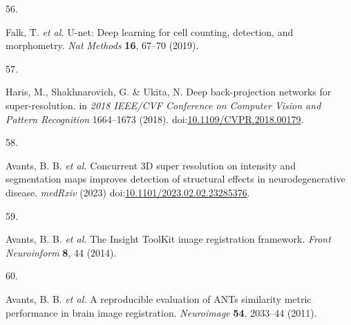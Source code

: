\documentclass[
  12pt,
]{article}
\newlength{\cslhangindent}
\newlength{\csllabelwidth}
\newenvironment{CSLReferences}[2] %
 {%
  \setlength{\parindent}{0pt}
  \ifodd #1 \everypar{\setlength{\hangindent}{\cslhangindent}}\ignorespaces\fi
  \ifnum #2 > 0
  \setlength{\parskip}{#2\baselineskip}
  \fi
 }%
 {}
\newcommand{\CSLLeftMargin}[1]{\parbox[t]{\csllabelwidth}{#1}}
\newcommand{\CSLRightInline}[1]{\parbox[t]{\linewidth - \csllabelwidth}{#1}\break}
\begin{document}
\begin{CSLReferences}{0}{0}
\leavevmode{}%
\CSLLeftMargin{56. }
\CSLRightInline{Falk, T. \emph{et al.} U-net: Deep learning for cell
counting, detection, and morphometry. \emph{Nat Methods} \textbf{16},
67--70 (2019).}

\leavevmode{}%
\CSLLeftMargin{57. }
\CSLRightInline{Haris, M., Shakhnarovich, G. \& Ukita, N. Deep
back-projection networks for super-resolution. in \emph{2018 {IEEE/CVF}
{C}onference on {C}omputer {V}ision and {P}attern {R}ecognition}
1664--1673 (2018).
doi:\href{https://doi.org/10.1109/CVPR.2018.00179}{10.1109/CVPR.2018.00179}.}

\leavevmode{}%
\CSLLeftMargin{58. }
\CSLRightInline{Avants, B. B. \emph{et al.} Concurrent 3D super
resolution on intensity and segmentation maps improves detection of
structural effects in neurodegenerative disease. \emph{medRxiv} (2023)
doi:\href{https://doi.org/10.1101/2023.02.02.23285376}{10.1101/2023.02.02.23285376}.}

\leavevmode{}%
\CSLLeftMargin{59. }
\CSLRightInline{Avants, B. B. \emph{et al.} The {Insight} {ToolKit}
image registration framework. \emph{Front Neuroinform} \textbf{8}, 44
(2014).}

\leavevmode{}%
\CSLLeftMargin{60. }
\CSLRightInline{Avants, B. B. \emph{et al.} A reproducible evaluation of
ANTs similarity metric performance in brain image registration.
\emph{Neuroimage} \textbf{54}, 2033--44 (2011).}

\end{CSLReferences}
\end{document}
